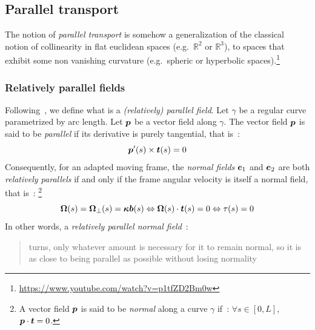 \subsection{Parallel transport}\label{sec:paralleltransport}
The notion of \emph{parallel transport} is somehow a generalization of the classical notion of collinearity in flat euclidean spaces (e.g.\ $\mathbb{R}^2$ or $\mathbb{R}^3$), to spaces that exhibit some non vanishing curvature (e.g.\ spheric or hyperbolic spaces).\footnote{\url{https://www.youtube.com/watch?v=p1tfZD2Bm0w}}

\subsubsection{Relatively parallel fields}
Following~\cite{Bishop1975}, we define what is a \emph{(relatively) parallel field}. Let $\gamma$ be a regular curve parametrized by arc length. Let $\boldsymbol{p}$ be a vector field along $\gamma$. The vector field $\boldsymbol{p}$ is said to be \emph{parallel} if its derivative is purely tangential, that is~:
\begin{equation}
	\boldsymbol{p}'(s) \times \boldsymbol{t}(s) = 0
\end{equation}
Consequently, for an adapted moving frame, the \emph{normal fields} $\boldsymbol{e}_1$ and $\boldsymbol{e}_2$ are both \emph{relatively parallels} if and only if the frame angular velocity is itself a normal field, that is~: \footnote{A vector field $\boldsymbol{p}$ is said to be \emph{normal} along a curve $\gamma$ if~: $\forall s \in [0,L]$, $\boldsymbol{p}\cdot\boldsymbol{t} = 0$.}
\begin{equation}
	\boldsymbol{\Omega}(s) = \boldsymbol{\Omega}_{\perp}(s) =  \boldsymbol{\kappa b}(s) \Leftrightarrow \boldsymbol{\Omega}(s) \cdot \boldsymbol{t}(s) = 0  \Leftrightarrow \tau(s) = 0  
\end{equation}
In other words, a \emph{relatively parallel normal field}~: \blockcquote{Bishop1975}{turns, only whatever amount is necessary for it to remain normal, so it is as close to being parallel as possible without losing normality}. 
%

